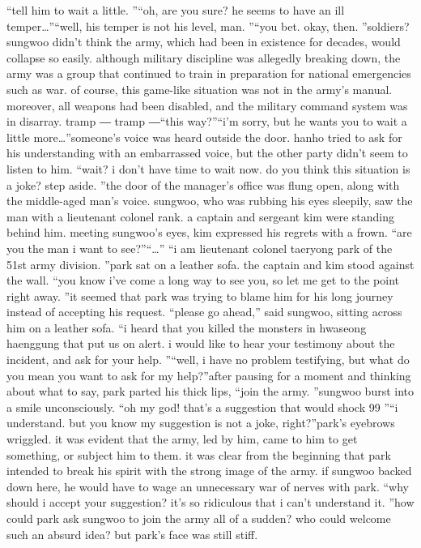“tell him to wait a little.
”“oh, are you sure? he seems to have an ill temper…”“well, his temper is not his level, man.
”“you bet.
 okay, then.
”soldiers? sungwoo didn’t think the army, which had been in existence for decades, would collapse so easily.
 although military discipline was allegedly breaking down, the army was a group that continued to train in preparation for national emergencies such as war.
of course, this game-like situation was not in the army’s manual.
 moreover, all weapons had been disabled, and the military command system was in disarray.
tramp ― tramp ―“this way?”“i’m sorry, but he wants you to wait a little more…”someone’s voice was heard outside the door.
 hanho tried to ask for his understanding with an embarrassed voice, but the other party didn’t seem to listen to him.
“wait? i don’t have time to wait now.
 do you think this situation is a joke? step aside.
”the door of the manager’s office was flung open, along with the middle-aged man’s voice.
 sungwoo, who was rubbing his eyes sleepily, saw the man with a lieutenant colonel rank.
 a captain and sergeant kim were standing behind him.
 meeting sungwoo’s eyes, kim expressed his regrets with a frown.
“are you the man i want to see?”“…”
“i am lieutenant colonel taeryong park of the 51st army division.
”park sat on a leather sofa.
 the captain and kim stood against the wall.
“you know i’ve come a long way to see you, so let me get to the point right away.
”it seemed that park was trying to blame him for his long journey instead of accepting his request.
“please go ahead,” said sungwoo, sitting across him on a leather sofa.
“i heard that you killed the monsters in hwaseong haenggung that put us on alert.
 i would like to hear your testimony about the incident, and ask for your help.
”“well, i have no problem testifying, but what do you mean you want to ask for my help?”after pausing for a moment and thinking about what to say, park parted his thick lips, “join the army.
”sungwoo burst into a smile unconsciously.
“oh my god! that’s a suggestion that would shock 99%
”“i understand.
 but you know my suggestion is not a joke, right?”park’s eyebrows wriggled.
 it was evident that the army, led by him, came to him to get something, or subject him to them.
 it was clear from the beginning that park intended to break his spirit with the strong image of the army.
 if sungwoo backed down here, he would have to wage an unnecessary war of nerves with park.
“why should i accept your suggestion? it’s so ridiculous that i can’t understand it.
”how could park ask sungwoo to join the army all of a sudden? who could welcome such an absurd idea? but park’s face was still stiff.
